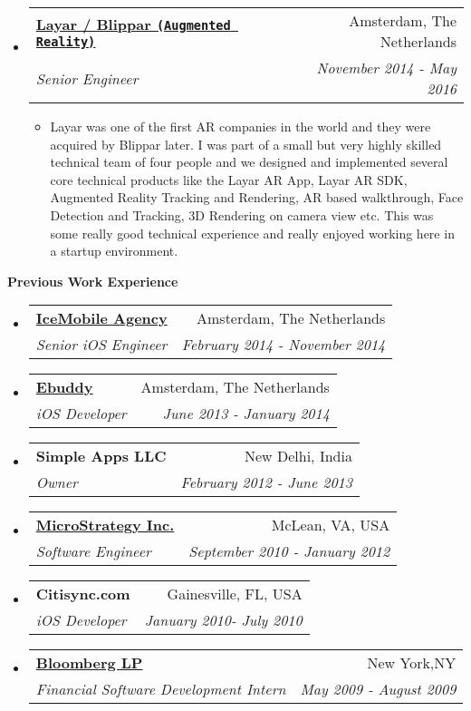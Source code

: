\documentclass[letterpaper,11pt]{article}
\makeatletter
\newcommand{\resitem}[1]{\item #1 \vspace{-2pt}}
\newcommand{\resheading}[1]{{\large \colorbox{mygrey}{\begin{minipage}{\textwidth}{\textbf{#1 \vphantom{p\^{E}}}}\end{minipage}}}}
\newcommand{\ressubheading}[4]{
\begin{tabular*}{7.0in}{l@{\extracolsep{\fill}}r}
    \textbf{#1} & #2 \\
    \textit{#3} & \textit{#4} \\
\end{tabular*}\vspace{-6pt}}
\makeatother
\begin{document}
\begin{itemize}
\vspace{0.3in}

\item
    \ressubheading{\href{https://www.layar.com/}{Layar / Blippar \texttt{(Augmented Reality)}}}{Amsterdam, The Netherlands}{Senior Engineer}{November 2014 - May 2016}
    \begin{itemize}
        \vspace{0.05in}
        \resitem{ Layar was one of the first AR companies in the world and they were acquired by Blippar later. I was part of a small but very highly skilled technical team of four people and we designed and implemented several core technical products like the Layar AR App, Layar AR SDK, Augmented Reality Tracking and Rendering, AR based walkthrough, Face Detection and Tracking, 3D Rendering on camera view etc. This was some really good technical experience and really enjoyed working here in a startup environment.  }
    \end{itemize}

\end{itemize}
\vspace{0.2in}

\resheading{Previous Work Experience}
\begin{itemize}

\item
    \ressubheading{\href{http://www.icemobile.com}{IceMobile Agency}}{Amsterdam, The Netherlands}{Senior iOS Engineer}{February 2014 - November 2014}

\item
    \ressubheading{\href{http://www.ebuddy.com}{Ebuddy}}{Amsterdam, The Netherlands}{iOS Developer}{June 2013 - January 2014}

\item
    \ressubheading{Simple Apps LLC}{New Delhi, India}{Owner}{February 2012 - June 2013}

\item
    \ressubheading{\href{http://www.microstrategy.com/Company}{MicroStrategy Inc.}}{McLean, VA, USA}{Software Engineer}{September 2010 - January 2012}
    
\item
    \ressubheading{Citisync.com}{Gainesville, FL, USA}{iOS Developer}{January 2010- July 2010}
    
\item
    \ressubheading{\href{http://www.bloomberg.com}{Bloomberg LP}}{New York,NY}{Financial Software Development Intern}{May 2009 - August 2009}
    
\end{itemize}
\end{document}
